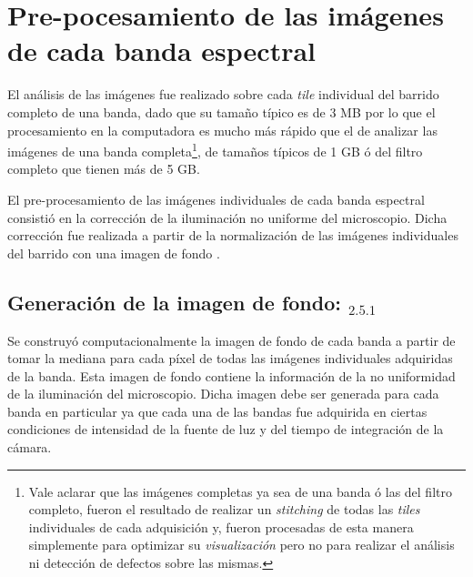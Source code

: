 \section{Pre-pocesamiento de las imágenes de cada banda espectral }
\label{sec:preproc}

\hspace{0.5cm}El análisis de las imágenes fue realizado sobre cada \textit{tile} individual del barrido completo de una banda, dado que su tamaño típico es de 3 MB por lo que el procesamiento en la computadora es mucho más rápido que el de analizar las imágenes de una banda completa\footnote{Vale aclarar que las imágenes completas ya sea de una banda ó las del filtro completo, fueron el resultado de realizar un \textit{stitching} de todas las \textit{tiles} individuales de cada adquisición y, fueron procesadas de esta manera simplemente para optimizar su \textit{visualización} pero no para realizar el análisis ni detección de defectos sobre las mismas.}, de tamaños típicos de 1 GB ó del filtro completo que tienen más de 5 GB.

El pre-procesamiento de las imágenes individuales de cada banda espectral consistió en la corrección de la iluminación no uniforme del microscopio. Dicha corrección fue realizada a partir de la normalización de  las imágenes individuales del barrido con una imagen de fondo \cite{Nordenfelt}. 

\singlespacing
\subsection{Generación de la imagen de fondo: \href{https://github.com/jrr1984/defects_analysis/blob/master/bg.py}{\faGithub$_{2.5.1}$}}
\label{sec:genimf}

\hspace{0.5cm}Se construyó computacionalmente la imagen de fondo de cada banda a partir de tomar la mediana para cada píxel de todas las imágenes individuales adquiridas de la banda. Esta imagen de fondo contiene la información de la no uniformidad de la iluminación del microscopio. Dicha imagen debe ser generada para cada banda en particular ya que cada una de las bandas fue adquirida en ciertas condiciones de intensidad de la fuente de luz y del tiempo de integración de la cámara. 

